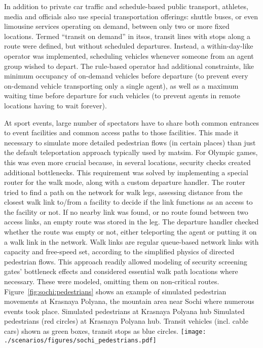 In addition to private car traffic and schedule-based public transport, 
athletes, media and officials also use special transportation offerings:
shuttle buses, or even limousine services operating on demand, between only two
or more fixed locations. Termed ``transit on demand'' in \gls{itsos}, transit lines
with stops along a route were defined, but without scheduled departures. 
Instead, a within-day-like operator was implemented, scheduling vehicles
whenever someone from an agent group wished to depart. The
rule-based operator had additional constraints, like minimum occupancy of
on-demand vehicles before departure (to prevent every on-demand vehicle
transporting only a single agent), as well as a maximum waiting time before
departure for such vehicles (to prevent agents in remote locations having to
wait forever).

At sport events, large number of spectators have to share both common entrances
to event facilities and common access paths to those facilities. This
made it necessary to simulate more detailed pedestrian flows (in certain places) 
than just the default \gls{teleportation} approach typically used by
\gls{matsim}. For Olympic games, this was even more crucial because,
in several locations, security checks created additional
bottlenecks. This requirement was solved by implementing a special router for
the walk mode, along with a custom departure handler. The router tried to find a
path on the network for walk legs, assessing distance from the closest walk
link to/from a facility to decide if the link functions as an access to the
facility or not. If no nearby link was found, or no route found between
two access links, an empty route was stored in the leg. The departure handler
checked whether the route was empty or not, either teleporting the agent or putting it
on a walk link in the network. Walk links are regular queue-based network links
with capacity and free-speed set, according to the simplified physics of
directed pedestrian flows. This approach readily allowed modeling of security
screening gates' bottleneck effects and considered essential
walk path locations where necessary. These were modeled, omitting them
on non-critical routes. Figure~\ref{fig:sochi:pedestrians}
shows an example of simulated pedestrian movements at Krasnaya Polyana, the
mountain area near Sochi where numerous events took place.  
%
\createfigure%
{Simulated pedestrians at Krasnaya Polyana hub}%
{Simulated pedestrians (red circles) at Krasnaya Polyana hub. Transit vehicles
(incl. cable cars) shown as green boxes, transit stops as blue circles.}%
{\label{fig:sochi:pedestrians}}%
{\texttt{[image: ./scenarios/figures/sochi\_pedestrians.pdf]}}%
{}
%

